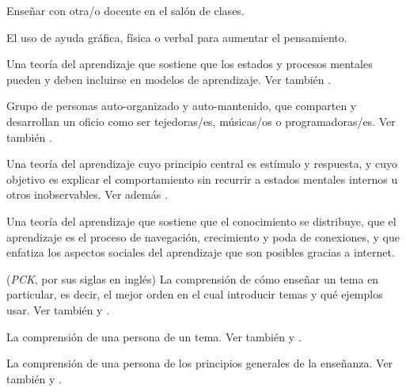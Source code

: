 \begin{description}
 Enseñar con otra/o docente en el
salón de clases.

 El uso de ayuda gráfica,
física o verbal para aumentar el pensamiento.

 Una teoría del aprendizaje que sostiene que los estados 
y procesos mentales pueden y deben incluirse en modelos de aprendizaje. Ver también
.

 Grupo de personas auto-organizado y auto-mantenido,
que comparten y desarrollan un oficio como ser tejedoras/es, músicas/os o programadoras/es. Ver también
.

 Una teoría del aprendizaje cuyo principio central
es estímulo y respuesta, y cuyo objetivo es explicar el comportamiento sin recurrir
a estados mentales internos u otros inobservables. Ver
además .

 Una teoría del aprendizaje que sostiene que el conocimiento se distribuye,
que el aprendizaje es el proceso de navegación, crecimiento y poda de conexiones, y que enfatiza los aspectos
sociales del aprendizaje que son posibles gracias a internet.

 (\emph{PCK}, por sus siglas en inglés) 
La comprensión de cómo enseñar un tema en particular, es decir, el mejor orden en el cual introducir temas y qué ejemplos usar. 
Ver también 
y .

 La comprensión de una
persona de un tema. Ver también
y .

 La
comprensión de una persona de los principios generales de la enseñanza. Ver también
y .


\end{description}

